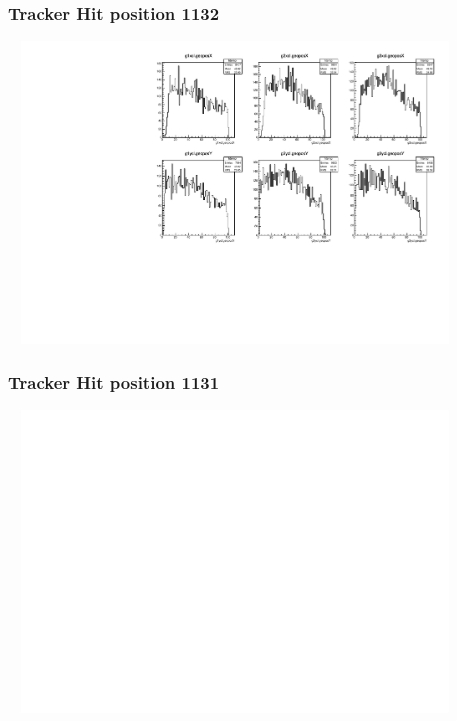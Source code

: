 \documentclass[slidestop,compress,mathserif]{beamer}
\begin{document}
\begin{frame}\frametitle{Tracker Hit position 1132}
	 \includegraphics[width=12cm,height=8cm]{Tracker_Hit_position_1132.pdf}
\end{frame}
\begin{frame}\frametitle{Tracker Hit position 1131}
	 \includegraphics[width=12cm,height=8cm]{Tracker_Hit_position_1131.pdf}
\end{frame}
\end{document}
